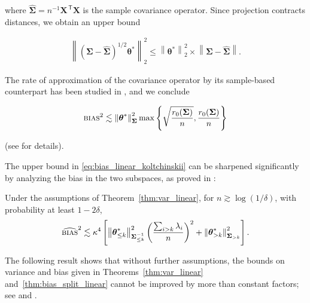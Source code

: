 where $\widehat{{\boldsymbol \Sigma}} = n^{-1}{\boldsymbol X}^\ensuremath{{\scriptscriptstyle\mathsf{\,T}}} {\boldsymbol X}$ is the sample covariance operator. Since projection contracts distances, we obtain an upper bound

\begin{align}
	\left\|({\boldsymbol \Sigma} - \widehat{{\boldsymbol \Sigma}})^{1/2} {\boldsymbol \theta}^*\right\|^2_2 \leq
    \left\|{\boldsymbol \theta}^*\right\|^2_2 \times \left\|{\boldsymbol \Sigma}-\widehat{{\boldsymbol \Sigma}}\right\|.
\end{align}

The rate of approximation of the covariance operator by its sample-based counterpart has been studied in \cite{koltchinskii2017concentration}, and we conclude

\begin{align}
		\label{eq:bias_linear_koltchinskii}
		{\textsc{bias}^2} \lesssim \left\|{\boldsymbol \theta}^*\right\|^2_{{\boldsymbol \Sigma}}  \max\left\{\sqrt{\frac{r_0({\boldsymbol \Sigma})}{n}}, \frac{r_0({\boldsymbol \Sigma})}{n}\right\}
	\end{align}

	
(see \cite{bartlett2020benign} for details).

The upper bound in \eqref{eq:bias_linear_koltchinskii} can be sharpened significantly by analyzing the bias in the two subspaces, as proved in \cite{tsigler2020benign}:

\begin{theorem}
	\label{thm:bias_split_linear}
	Under the assumptions of Theorem~\ref{thm:var_linear}, for
    $n\gtrsim\log(1/\delta)$, with probability at least $1-2\delta$,
	\begin{align}
		\label{eq:bias_split_linear}
		{\widehat{\textsc{bias}}^2} \lesssim \kappa^4\left[\left\|{\boldsymbol \theta}^*_{\leq k}\right\|_{{\boldsymbol \Sigma}_{\leq k}^{-1}}^2 \left( \frac{\sum_{i>k} \lambda_i}{n}\right)^2 + \left\|{\boldsymbol \theta}^*_{>k}\right\|^2_{{\boldsymbol \Sigma}_{>k}}\right].
	\end{align}	
\end{theorem}

The following result shows that without further assumptions, the bounds on variance and bias given in Theorems~\ref{thm:var_linear}
and~\ref{thm:bias_split_linear} cannot be improved by more than constant factors; see \cite{bartlett2020benign} and \cite{tsigler2020benign}.

